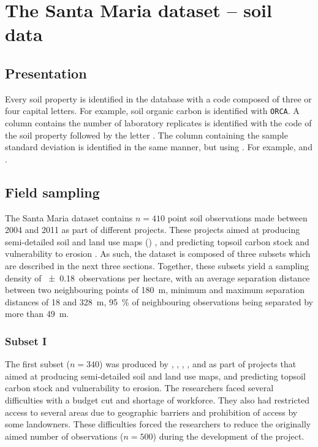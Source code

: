 \artigofalse
\chapter{The Santa Maria dataset -- soil data}
\label{apen:database-soil-data}

\tocless\section{Presentation}

Every soil property 
is identified in the database with a code composed of three or four capital letters. For example, soil 
organic carbon is identified with \texttt{ORCA}. A column contains the number of 
laboratory replicates is identified with the code of the soil property followed by the letter . The 
column containing the sample standard deviation is identified in the same manner, but using . For
example,  and .


\tocless\section{Field sampling}

The Santa Maria dataset contains $n = 410$ point soil observations made between 2004 and 2011 as part of
different projects. These projects aimed at producing semi-detailed soil and land use maps ()
\cite{Pedron2005,Miguel2010,SamuelRosaEtAl2011a,MiguelEtAl2012}, and predicting topsoil carbon stock and 
vulnerability to erosion \cite{Samuel-Rosa2009,MouraBueno2012,Miguel2013}. As such, the dataset is composed 
of three subsets which are described in the next three sections. Together, these subsets yield a sampling 
density of \num{\pm0.18}~observations per hectare, with an average separation distance between two neighbouring 
points of \SI{180}{\metre}, minimum and maximum separation distances of \num{18} and 
\SI{328}{\metre}, \SI{95}{\percent} of neighbouring observations being separated by more than 
\SI{49}{\metre}.

\tocless\subsection{Subset I}

The first subset ($n = 340$) was produced by , , 
, , and  as part
of projects that aimed at producing semi-detailed soil and land use maps, and predicting topsoil carbon stock 
and vulnerability to erosion. The researchers faced several difficulties with a budget cut and shortage 
of workforce. They also had restricted access to several areas due to geographic barriers and prohibition of 
access by some landowners. These difficulties forced the researchers to reduce the originally aimed number of 
observations ($n = 500$) during the development of the project.

